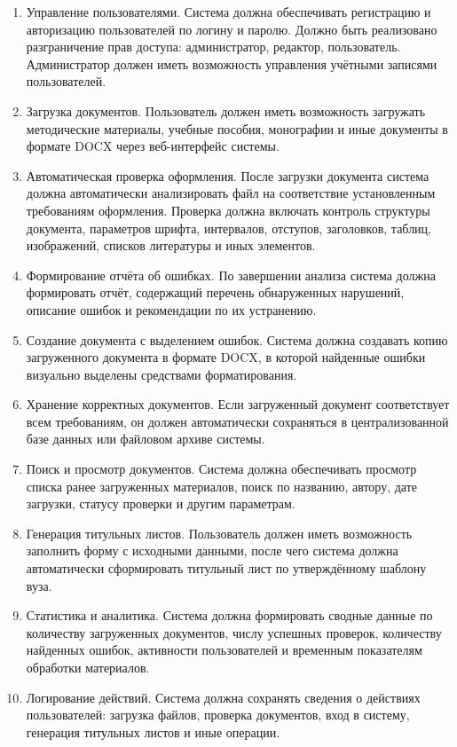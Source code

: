 \begin{enumerate}
	\item Управление пользователями. Система должна обеспечивать регистрацию и авторизацию пользователей по логину и паролю. Должно быть реализовано разграничение прав доступа: администратор, редактор, пользователь. Администратор должен иметь возможность управления учётными записями пользователей.
	
	\item Загрузка документов. Пользователь должен иметь возможность загружать методические материалы, учебные пособия, монографии и иные документы в формате DOCX через веб-интерфейс системы.
	
	\item Автоматическая проверка оформления. После загрузки документа система должна автоматически анализировать файл на соответствие установленным требованиям оформления. Проверка должна включать контроль структуры документа, параметров шрифта, интервалов, отступов, заголовков, таблиц, изображений, списков литературы и иных элементов.
	
	\item Формирование отчёта об ошибках. По завершении анализа система должна формировать отчёт, содержащий перечень обнаруженных нарушений, описание ошибок и рекомендации по их устранению.
	
	\item Создание документа с выделением ошибок. Система должна создавать копию загруженного документа в формате DOCX, в которой найденные ошибки визуально выделены средствами форматирования.
	
	\item Хранение корректных документов. Если загруженный документ соответствует всем требованиям, он должен автоматически сохраняться в централизованной базе данных или файловом архиве системы.
	
	\item Поиск и просмотр документов. Система должна обеспечивать просмотр списка ранее загруженных материалов, поиск по названию, автору, дате загрузки, статусу проверки и другим параметрам.
	
	\item Генерация титульных листов. Пользователь должен иметь возможность заполнить форму с исходными данными, после чего система должна автоматически сформировать титульный лист по утверждённому шаблону вуза.
	
	\item Статистика и аналитика. Система должна формировать сводные данные по количеству загруженных документов, числу успешных проверок, количеству найденных ошибок, активности пользователей и временным показателям обработки материалов.
	
	\item Логирование действий. Система должна сохранять сведения о действиях пользователей: загрузка файлов, проверка документов, вход в систему, генерация титульных листов и иные операции.
\end{enumerate}

